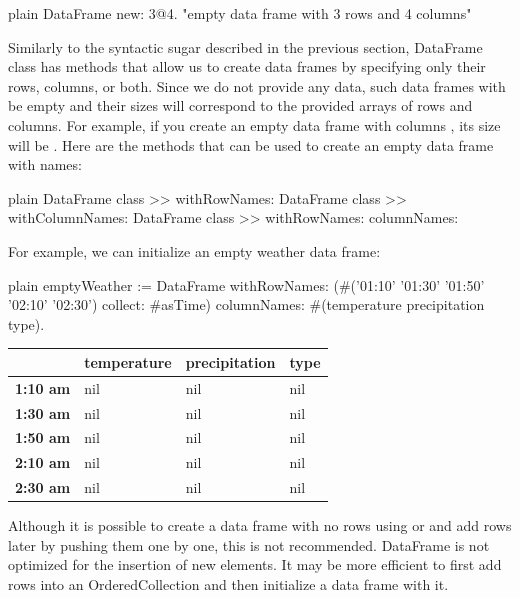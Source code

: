 \documentclass[10pt,twoside,english]{_support/latex/sbabook/sbabook}
\begin{document}
\begin{displaycode}{plain}
DataFrame new: 3@4. "empty data frame with 3 rows and 4 columns"
\end{displaycode}

Similarly to the syntactic sugar described in the previous section, DataFrame class has methods that allow us to create data frames by specifying only their rows, columns, or both. Since we do not provide any data, such data frames with be empty and their sizes will correspond to the provided arrays of rows and columns. For example, if you create an empty data frame with columns , its size will be . Here are the methods that can be used to create an empty data frame with names:

\begin{displaycode}{plain}
DataFrame class >> withRowNames:
DataFrame class >> withColumnNames:
DataFrame class >> withRowNames: columnNames:
\end{displaycode}

For example, we can initialize an empty weather data frame:

\begin{displaycode}{plain}
emptyWeather := DataFrame
  withRowNames: (#('01:10' '01:30' '01:50' '02:10' '02:30') collect: #asTime)
  columnNames: #(temperature precipitation type).
\end{displaycode}

\begin{tabular}{llll}
\toprule
 & \textbf{temperature} & \textbf{precipitation} & \textbf{type} \\
\midrule
\textbf{1:10 am} & nil & nil & nil \\
\textbf{1:30 am} & nil & nil & nil \\
\textbf{1:50 am} & nil & nil & nil \\
\textbf{2:10 am} & nil & nil & nil \\
\textbf{2:30 am} & nil & nil & nil \\
\bottomrule
\end{tabular}

\begin{note}
Although it is possible to create a data frame with no rows using  or  and add rows later by pushing them one by one, this is not recommended. DataFrame is not optimized for the insertion of new elements. It may be more efficient to first add rows into an OrderedCollection and then initialize a data frame with it.
\end{note}
\end{document}
